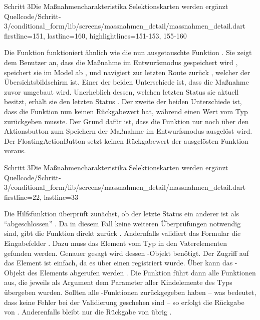 \begin{alexlisting}{Schritt 3}{Die Maßnahmencharakteristika Selektionskarten werden ergänzt}
    {Quellcode/Schritt-3/conditional_form/lib/screens/massnahmen_detail/massnahmen_detail.dart}
    {firstline=151, lastline=160, highlightlines={151-153, 155-160}}
    \label{lst:Schritt3onWillPop}
\end{alexlisting}

Die Funktion  funktioniert ähnlich wie die nun ausgetauschte Funktion .
Sie zeigt dem Benutzer an, dass die Maßnahme im Entwurfsmodus gespeichert wird , speichert sie im Model ab , und navigiert zur letzten Route zurück , welcher der Übersichtsbildschirm ist.  Einer der beiden Unterschiede ist, dass die Maßnahme zuvor umgebaut wird. Unerheblich dessen, welchen letzten Status sie aktuell besitzt, erhält sie den letzten Status  . Der zweite der beiden Unterschiede ist, dass die Funktion nun keinen Rückgabewert hat, während  einen Wert vom Typ  zurückgeben musste. Der Grund dafür ist, dass die Funktion nur noch über den Aktionsbutton zum Speichern der Maßnahme im Entwurfsmodus ausgelöst wird. Der FloatingActionButton setzt keinen Rückgabewert der ausgelösten Funktion voraus.

\begin{alexlisting}{Schritt 3}{Die Maßnahmencharakteristika Selektionskarten werden ergänzt}
    {Quellcode/Schritt-3/conditional_form/lib/screens/massnahmen_detail/massnahmen_detail.dart}
    {firstline=22, lastline=33}
    \label{lst:Schritt3saveDraftAndGoBackToOverviewScreen}
\end{alexlisting}

Die Hilfsfunktion  überprüft zunächst, ob der letzte Status ein anderer ist als \enquote{abgeschlossen} . Da in diesem Fall keine weiteren Überprüfungen notwendig sind, gibt die Funktion direkt  zurück .
Andernfalls validiert das Formular die Eingabefelder . Dazu muss das Element vom Typ  in den Vaterelementen gefunden werden. Genauer gesagt wird dessen -Objekt benötigt. Der Zugriff auf das Element ist einfach, da es über einen  registriert wurde. Über  kann das -Objekt des Elements abgerufen werden . Die Funktion  führt dann alle Funktionen aus, die jeweils als Argument dem Parameter  aller Kindelemente des Typs  übergeben wurden. Sollten alle -Funktionen  zurückgegeben haben -- was bedeutet, dass keine Fehler bei der Validierung geschehen sind -- so erfolgt die Rückgabe von  . Anderenfalls bleibt nur die Rückgabe von  übrig .

